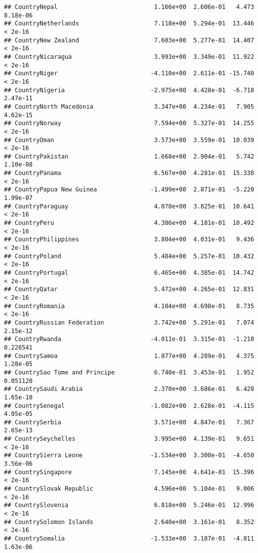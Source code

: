 \documentclass[
]{article}
\begin{document}
\begin{verbatim}
## CountryNepal                           1.166e+00  2.606e-01   4.473 8.18e-06
## CountryNetherlands                     7.118e+00  5.294e-01  13.446  < 2e-16
## CountryNew Zealand                     7.603e+00  5.277e-01  14.407  < 2e-16
## CountryNicaragua                       3.993e+00  3.349e-01  11.922  < 2e-16
## CountryNiger                          -4.110e+00  2.611e-01 -15.740  < 2e-16
## CountryNigeria                        -2.975e+00  4.428e-01  -6.718 2.47e-11
## CountryNorth Macedonia                 3.347e+00  4.234e-01   7.905 4.62e-15
## CountryNorway                          7.594e+00  5.327e-01  14.255  < 2e-16
## CountryOman                            3.573e+00  3.559e-01  10.039  < 2e-16
## CountryPakistan                        1.668e+00  2.904e-01   5.742 1.10e-08
## CountryPanama                          6.567e+00  4.281e-01  15.338  < 2e-16
## CountryPapua New Guinea               -1.499e+00  2.871e-01  -5.220 1.99e-07
## CountryParaguay                        4.070e+00  3.825e-01  10.641  < 2e-16
## CountryPeru                            4.386e+00  4.181e-01  10.492  < 2e-16
## CountryPhilippines                     3.804e+00  4.031e-01   9.436  < 2e-16
## CountryPoland                          5.484e+00  5.257e-01  10.432  < 2e-16
## CountryPortugal                        6.465e+00  4.385e-01  14.742  < 2e-16
## CountryQatar                           5.472e+00  4.265e-01  12.831  < 2e-16
## CountryRomania                         4.104e+00  4.698e-01   8.735  < 2e-16
## CountryRussian Federation              3.742e+00  5.291e-01   7.074 2.15e-12
## CountryRwanda                         -4.011e-01  3.315e-01  -1.210 0.226541
## CountrySamoa                           1.877e+00  4.289e-01   4.375 1.28e-05
## CountrySao Tome and Principe           6.740e-01  3.453e-01   1.952 0.051120
## CountrySaudi Arabia                    2.370e+00  3.686e-01   6.428 1.65e-10
## CountrySenegal                        -1.082e+00  2.628e-01  -4.115 4.05e-05
## CountrySerbia                          3.571e+00  4.847e-01   7.367 2.65e-13
## CountrySeychelles                      3.995e+00  4.139e-01   9.651  < 2e-16
## CountrySierra Leone                   -1.534e+00  3.300e-01  -4.650 3.56e-06
## CountrySingapore                       7.145e+00  4.641e-01  15.396  < 2e-16
## CountrySlovak Republic                 4.596e+00  5.104e-01   9.006  < 2e-16
## CountrySlovenia                        6.818e+00  5.246e-01  12.996  < 2e-16
## CountrySolomon Islands                 2.640e+00  3.161e-01   8.352  < 2e-16
## CountrySomalia                        -1.533e+00  3.187e-01  -4.811 1.63e-06

\end{verbatim}
\end{document}
